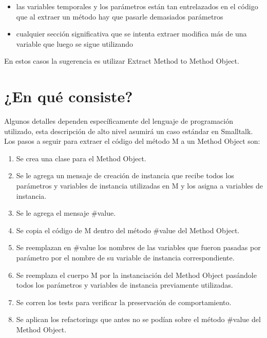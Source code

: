 \begin{itemize}
    \item las variables temporales y los parámetros están tan entrelazados en el código que al extraer 
    un método hay que pasarle demasiados parámetros
    \item cualquier sección significativa que se intenta extraer modifica más de una variable que
    luego se sigue utilizando
\end{itemize}

En estos casos la sugerencia es utilizar Extract Method to Method Object.


\section{¿En qué consiste?}

Algunos detalles dependen específicamente del lenguaje de programación utilizado, esta descripción
de alto nivel asumirá un caso estándar en Smalltalk. Los pasos a seguir para extraer el código
del método M a un Method Object son:

\begin{enumerate}
    \item Se crea una clase para el Method Object.
    \item Se le agrega un mensaje de creación de instancia que recibe todos los parámetros y
    variables de instancia utilizadas en M y los asigna a variables de instancia.
    \item Se le agrega el mensaje \#value.
    \item Se copia el código de M dentro del método \#value del Method Object.
    \item Se reemplazan en \#value los nombres de las variables que fueron pasadas por parámetro
    por el nombre de su variable de instancia correspondiente.
    \item Se reemplaza el cuerpo M por la instanciación del Method Object pasándole todos los
    parámetros y variables de instancia previamente utilizadas.
    \item Se corren los tests para verificar la preservación de comportamiento.
    \item Se aplican los refactorings que antes no se podían sobre el método \#value del Method
    Object.
\end{enumerate}

